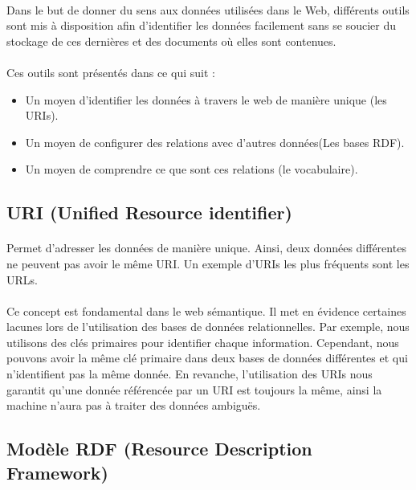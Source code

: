 \documentclass[12pt, a4paper, oneside]{book}
\begin{document}
\paragraph{}
Dans le but de donner du sens aux données utilisées dans le Web, différents outils sont mis à disposition afin d'identifier les données facilement sans se soucier du stockage de ces dernières et des documents où elles sont contenues.
\paragraph{}
Ces outils sont présentés dans ce qui suit :
\begin{itemize}
\item Un moyen d'identifier les données à travers le web de manière unique (les URIs).
\item Un moyen de configurer des relations avec d'autres données(Les bases RDF).
\item Un moyen de comprendre ce que sont ces relations (le vocabulaire).
\end{itemize}

\subsection{URI (Unified Resource identifier)}
\paragraph{}
Permet d'adresser les données de manière unique. 
Ainsi, deux données différentes ne peuvent pas avoir le même URI.
Un exemple d'URIs les plus fréquents sont les URLs.
\paragraph{}
Ce concept est fondamental dans le web sémantique.
Il met en évidence certaines lacunes lors de l'utilisation des bases de données relationnelles.
Par exemple, nous utilisons des clés primaires pour identifier chaque information. Cependant, nous pouvons avoir la même clé primaire dans deux bases de données différentes et qui n'identifient pas la même donnée. 
En revanche, l'utilisation des URIs nous garantit qu'une donnée référencée par un URI est toujours la même, ainsi la machine n'aura pas à traiter des données ambiguës.

\subsection{Modèle RDF (Resource Description Framework)}
\end{document}
